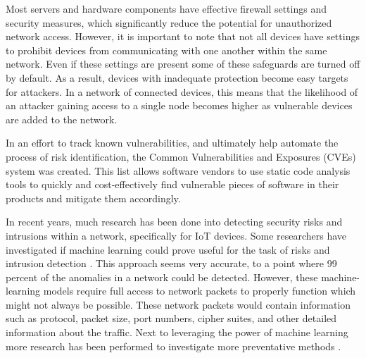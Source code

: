 Most servers and hardware components have effective firewall settings and security measures, which significantly reduce the potential for unauthorized network access. However, it is important to note that not all devices have settings to prohibit devices from communicating with one another within the same network. Even if these settings are present some of these safeguards are turned off by default. As a result, devices with inadequate protection become easy targets for attackers. In a network of connected devices, this means that the likelihood of an attacker gaining access to a single node becomes higher as vulnerable devices are added to the network.

In an effort to track known vulnerabilities, and ultimately help automate the process of risk identification, the Common Vulnerabilities and Exposures (CVEs) system was created. This list allows software vendors to use static code analysis tools to quickly and cost-effectively find vulnerable pieces of software in their products and mitigate them accordingly. 


In recent years, much research has been done into detecting security risks and intrusions within a network, specifically for IoT devices. Some researchers have investigated if machine learning could prove useful for the task of risks and intrusion detection \cite{canedo2016using, doshi2018machine, hamza2019detecting, sivanathan2018classifying}. 
 This approach seems very accurate, to a point where 99 percent of the anomalies in a network could be detected. However, these machine-learning models require full access to network packets to properly function which might not always be possible. These network packets would contain information such as protocol, packet size, port numbers, cipher suites, and other detailed information about the traffic. Next to leveraging the power of machine learning more research has been performed to investigate more preventative methods \cite{miettinen2017iot, hamza2019detecting, paudel2019detecting}.

